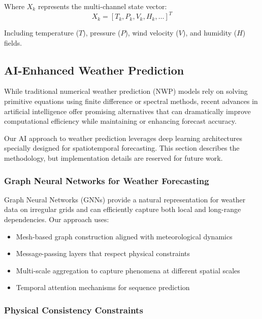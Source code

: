 \documentclass{article}
\begin{document}
Where $X_k$ represents the multi-channel state vector:
\begin{equation}
X_k = [T_k, P_k, V_k, H_k, \ldots]^T
\end{equation}

Including temperature ($T$), pressure ($P$), wind velocity ($V$), and humidity ($H$) fields.

\subsection{AI-Enhanced Weather Prediction}
\label{sec:ai_weather}

While traditional numerical weather prediction (NWP) models rely on solving primitive equations using finite difference or spectral methods, recent advances in artificial intelligence offer promising alternatives that can dramatically improve computational efficiency while maintaining or enhancing forecast accuracy.

Our AI approach to weather prediction leverages deep learning architectures specially designed for spatiotemporal forecasting. This section describes the methodology, but implementation details are reserved for future work.

\subsubsection{Graph Neural Networks for Weather Forecasting}

Graph Neural Networks (GNNs) provide a natural representation for weather data on irregular grids and can efficiently capture both local and long-range dependencies. Our approach uses:

\begin{itemize}
    \item Mesh-based graph construction aligned with meteorological dynamics
    \item Message-passing layers that respect physical constraints
    \item Multi-scale aggregation to capture phenomena at different spatial scales
    \item Temporal attention mechanisms for sequence prediction
\end{itemize}

\subsubsection{Physical Consistency Constraints}
\end{document}
